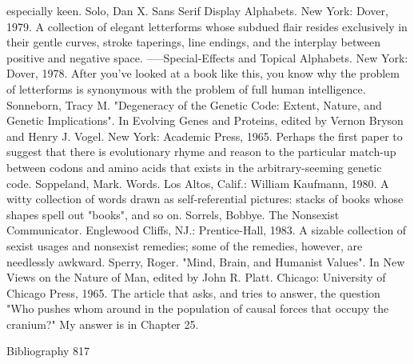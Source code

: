   especially keen.
Solo, Dan X. Sans Serif Display Alphabets. New York: Dover, 1979. A collection of elegant
  letterforms whose subdued flair resides exclusively in their gentle curves, stroke taperings,
  line endings, and the interplay between positive and negative space.
-----Special-Effects and Topical Alphabets. New York: Dover, 1978. After you've looked at a
  book like this, you know why the problem of letterforms is synonymous with the problem
  of full human intelligence.
Sonneborn, Tracy M. "Degeneracy of the Genetic Code: Extent, Nature, and Genetic
  Implications". In Evolving Genes and Proteins, edited by Vernon Bryson and
Henry J. Vogel. New York: Academic Press, 1965. Perhaps the first paper to suggest that
  there is evolutionary rhyme and reason to the particular match-up between codons and
  amino acids that exists in the arbitrary-seeming genetic code.
Soppeland, Mark. Words. Los Altos, Calif.: William Kaufmann, 1980. A witty collection of
  words drawn as self-referential pictures: stacks of books whose shapes spell out "books",
  and so on.
Sorrels, Bobbye. The Nonsexist Communicator. Englewood Cliffs, NJ.: Prentice-Hall, 1983.
  A sizable collection of sexist usages and nonsexist remedies; some of the remedies,
  however, are needlessly awkward.
Sperry, Roger. "Mind, Brain, and Humanist Values". In New Views on the Nature of Man,
  edited by John R. Platt. Chicago: University of Chicago Press, 1965. The article that asks,
  and tries to answer, the question "Who pushes whom around in the population of causal
  forces that occupy the cranium?" My answer is in Chapter 25.


Bibliography                                                                               817

